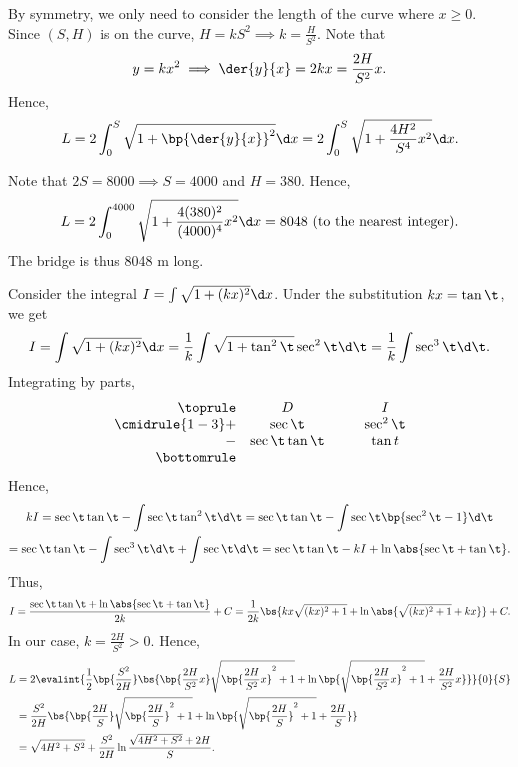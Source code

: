 \begin{solution}
    By symmetry, we only need to consider the length of the curve where $x \geq 0$. Since $(S, H)$ is on the curve, $H = kS^2 \implies k = \frac{H}{S^2}$. Note that \[y = kx^2 \implies \der{y}{x} = 2kx = \frac{2H}{S^2}x.\] Hence, 
    \[L = 2 \int_0^S \sqrt{1 + \bp{\der{y}{x}}^2} \d x = 2 \int_0^S \sqrt{1 + \frac{4H^2}{S^4} x^2} \d x.\]

    \begin{ppart}
        Note that $2S = 8000 \implies S = 4000$ and $H = 380$. Hence, \[L = 2 \int_0^{4000} \sqrt{1 + \frac{4(380)^2}{(4000)^4} x^2} \d x = 8048 \text{ (to the nearest integer)}.\] The bridge is thus 8048 m long.
    \end{ppart}
    \begin{ppart}
        Consider the integral $I = \int \sqrt{1 + (kx)^2} \d x$. Under the substitution $kx = \tan \t$, we get \[I = \int \sqrt{1 + (kx)^2} \d x = \frac1k \int \sqrt{1 + \tan^2 \t} \sec^2 \t \d \t = \frac1k \int \sec^3 \t \d \t.\] Integrating by parts,
        \[\begin{array}{r c @{\hspace*{1.0cm}} c}\toprule
            & D & I \\\cmidrule{1-3}
            + & \sec \t & \sec^2 \t \\
            - & \sec \t \tan \t & \tan t \\\bottomrule
        \end{array}\] Hence,
        \begin{gather*}
            kI = \sec\t \tan \t - \int \sec \t \tan^2 \t \d \t = \sec\t \tan \t - \int \sec \t \bp{\sec^2 \t - 1} \d \t\\
            = \sec\t \tan \t - \int \sec^3 \t \d \t + \int \sec \t \d \t = \sec \t \tan \t - kI + \ln \abs{\sec \t + \tan \t}.
        \end{gather*}
        Thus, \[I = \frac{\sec \t \tan \t + \ln \abs{\sec \t + \tan \t}}{2k} + C = \frac1{2k} \bs{kx\sqrt{(kx)^2 + 1} + \ln \abs{\sqrt{(kx)^2 + 1} + kx}} + C.\] In our case, $k = \frac{2H}{S^2} > 0$. Hence,
        {\allowdisplaybreaks
        \begin{align*}
            L &= 2\evalint{\frac1{2} \bp{\frac{S^2}{2H}} \bs{\bp{\frac{2H}{S^2}x}\sqrt{\bp{\frac{2H}{S^2}x}^2 + 1} + \ln \bp{\sqrt{\bp{\frac{2H}{S^2}x}^2 + 1} + \frac{2H}{S^2}x}}}{0}{S}\\
            &= \frac{S^2}{2H} \bs{\bp{\frac{2H}{S}}\sqrt{\bp{\frac{2H}{S}}^2 + 1} + \ln \bp{\sqrt{\bp{\frac{2H}{S}}^2 + 1} + \frac{2H}{S}}}\\
            &= \sqrt{4H^2 + S^2} + \frac{S^2}{2H} \ln{\frac{\sqrt{4H^2 + S^2} + 2H}{S}}.
        \end{align*}}
    \end{ppart}
\end{solution}

